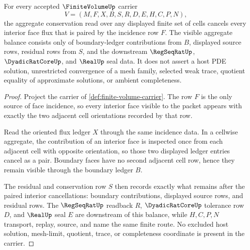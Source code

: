\begin{theorem}
\label{thm:finite-volume-conservation-balance}
For every accepted $\FiniteVolumeUp$ carrier
$$
V=(M,F,X,B,S,R,D,E,H,C,P,N),
$$
the aggregate conservation read over any displayed finite set of cells cancels every interior face flux that is paired by the incidence row $F$. The visible aggregate balance consists only of boundary-ledger contributions from $B$, displayed source rows, residual rows from $S$, and the downstream $\RegSeqRatUp$, $\DyadicRatCoreUp$, and $\RealUp$ seal data. It does not assert a host PDE solution, unrestricted convergence of a mesh family, selected weak trace, quotient equality of approximate solutions, or ambient completeness.
\end{theorem}
\begin{proof}
Project the carrier of \autoref{def:finite-volume-carrier}. The row $F$ is the only source of face incidence, so every interior face visible to the packet appears with exactly the two adjacent cell orientations recorded by that row.

Read the oriented flux ledger $X$ through the same incidence data. In a cellwise aggregate, the contribution of an interior face is inspected once from each adjacent cell with opposite orientation, so those two displayed ledger entries cancel as a pair. Boundary faces have no second adjacent cell row, hence they remain visible through the boundary ledger $B$.

The residual and conservation row $S$ then records exactly what remains after the paired interior cancellations: boundary contributions, displayed source rows, and residual rows. The $\RegSeqRatUp$ readback $R$, $\DyadicRatCoreUp$ tolerance row $D$, and $\RealUp$ seal $E$ are downstream of this balance, while $H,C,P,N$ transport, replay, source, and name the same finite route. No excluded host solution, mesh-limit, quotient, trace, or completeness coordinate is present in the carrier.
\end{proof}


